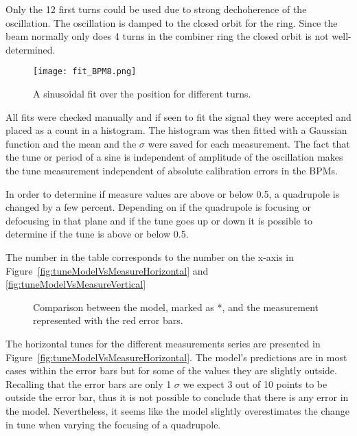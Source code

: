 Only the 12 first turns could be used due to strong dechoherence 
of the oscillation. The oscillation is damped to the closed orbit for the ring. 
Since the beam normally only does 4 turns in the combiner ring 
the closed orbit is not well-determined. 
\begin{figure}[!h]
\centering
\texttt{[image: fit\_BPM8.png]}
\caption{A sinusoidal fit over the position for different turns. \label{fig:fitOfPosition}}
\end{figure}
All fits were checked manually and if seen to fit the signal they were accepted and
placed as a count in a histogram. 
The histogram was then fitted with a Gaussian function and the mean and 
the $\sigma$ were saved for each measurement.
The fact that the tune or period of a sine is 
independent of amplitude of the oscillation makes the tune measurement 
independent of absolute calibration errors in the BPMs.
 
In order to determine if measure values are above or below 0.5, 
a quadrupole is changed by a few percent. 
Depending on if the quadrupole is focusing or 
defocusing in that plane and if the tune goes up or down it is possible to 
determine if the tune is above or below 0.5.  

The number in the table corresponds to the number on the x-axis in 
Figure~\ref{fig:tuneModelVsMeasureHorizontal} and \ref{fig:tuneModelVsMeasureVertical}

\begin{figure}[!h]
\centering
{}
\caption[Comparison between the tune from the model and the measurement]
{Comparison between the model, marked as *, and the measurement represented with the red error bars. 
}
\end{figure}
 
The horizontal tunes for the different measurements series are presented in 
Figure~\ref{fig:tuneModelVsMeasureHorizontal}. 
The model's predictions are in most cases within the error bars 
but for some of the values they are slightly outside. 
Recalling that the error bars are only 1 $\sigma$ we expect 
3 out of 10 points to be outside the error bar, 
thus it is not possible to conclude that there is any error in the model. 
Nevertheless, it seems like the model slightly overestimates 
the change in tune when varying the focusing of a quadrupole.


